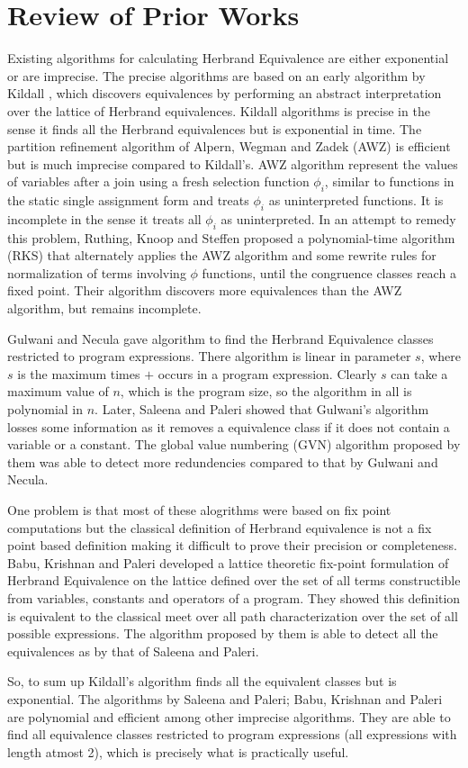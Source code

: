 \chapter{Review of Prior Works}
\label{chap:chapter2}

Existing algorithms for calculating Herbrand Equivalence are either
exponential or are imprecise. The precise algorithms are based on an 
early algorithm by Kildall \cite{Kildall}, which discovers 
equivalences by performing an abstract interpretation over the 
lattice of Herbrand equivalences. Kildall algorithms is precise in 
the sense it finds all the Herbrand equivalences but is exponential 
in time. The partition refinement algorithm of Alpern, Wegman and 
Zadek (AWZ) \cite{AWZ} is efficient but is much imprecise compared to 
Kildall's. AWZ algorithm represent the values of variables after a 
join using a fresh selection function $\phi_i$, similar to functions 
in the static single assignment form and treats $\phi_i$ as 
uninterpreted functions. It is incomplete in the sense it treats all 
$\phi_i$ as uninterpreted. In an attempt to remedy this problem, 
Ruthing, Knoop and Steffen proposed a polynomial-time algorithm (RKS) 
\cite{RKS} that alternately applies the AWZ algorithm and some 
rewrite rules for normalization of terms involving $\phi$ functions, 
until the congruence classes reach a fixed point. Their algorithm 
discovers more equivalences than the AWZ algorithm, but remains 
incomplete. 

Gulwani and Necula \cite{Gulwani} gave algorithm to find the Herbrand 
Equivalence classes restricted to program expressions. There 
algorithm is linear in parameter $s$, where $s$ is the maximum times 
$+$ occurs in a program expression. Clearly $s$ can take a maximum 
value of $n$, which is the program size, so the algorithm in all is 
polynomial in $n$. Later, Saleena and Paleri \cite{Saleena} showed  
that Gulwani's algorithm losses some information as it removes a 
equivalence class if it does not contain a variable or a constant. 
The global value numbering (GVN) algorithm proposed by them was able 
to detect more redundencies compared to that by Gulwani and Necula.

One problem is that most of these alogrithms were based on fix point 
computations but the classical definition of Herbrand equivalence is 
not a fix point based definition making it difficult to prove their 
precision or completeness. Babu, Krishnan and Paleri \cite{Babu} 
developed a lattice theoretic fix-point formulation of Herbrand 
Equivalence on the lattice defined over the set of all terms 
constructible from variables, constants and operators of a program. 
They showed this definition is equivalent to the classical meet over 
all path characterization over the set of all possible expressions. 
The algorithm proposed by them is able to detect all the equivalences 
as by that of Saleena and Paleri.

So, to sum up Kildall's algorithm finds all the equivalent classes 
but is exponential. The algorithms by Saleena and Paleri; Babu, 
Krishnan and Paleri are polynomial and efficient among other 
imprecise algorithms. They are able to find all equivalence classes 
restricted to program expressions (all expressions with length atmost 
2), which is precisely what is practically useful.